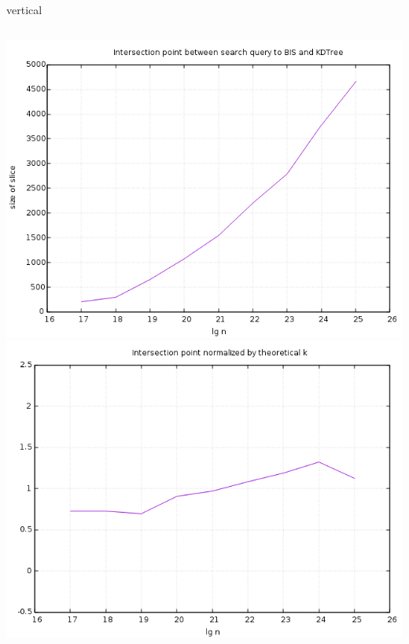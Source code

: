 \documentclass[pdf]{beamer}
\begin{document}
\begin{frame}{vertical}
  \begin{columns}
    \includegraphics[scale=0.3]{pictures/analysis/vert.png}
    \includegraphics[scale=0.3]{pictures/analysis/vert_theory.png}
  \end{columns}
\end{frame}
\end{document}
